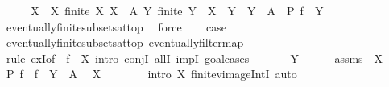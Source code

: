 \begin{isabellebody}
\ \ \isamarkupfalse%
\ \isamarkupfalse%
\ X\ \ X{\isacharcolon}{\kern0pt}\ {\isachardoublequoteopen}finite\ X{\isachardoublequoteclose}\ {\isachardoublequoteopen}X\ {\isasymsubseteq}\ A{\isachardoublequoteclose}\ {\isachardoublequoteopen}{\isasymAnd}Y{\isachardot}{\kern0pt}\ finite\ Y\ {\isasymLongrightarrow}\ X\ {\isasymsubseteq}\ Y\ {\isasymLongrightarrow}\ Y\ {\isasymsubseteq}\ A\ {\isasymLongrightarrow}\ P\ {\isacharparenleft}{\kern0pt}f\ {\isacharbackquote}{\kern0pt}\ Y{\isacharparenright}{\kern0pt}{\isachardoublequoteclose}\isanewline
\ \ \ \ \isamarkupfalse%
\ eventually{\isacharunderscore}{\kern0pt}finite{\isacharunderscore}{\kern0pt}subsets{\isacharunderscore}{\kern0pt}at{\isacharunderscore}{\kern0pt}top\ \isamarkupfalse%
\ force\isanewline
\ \ \isamarkupfalse%
\ {\isacharquery}{\kern0pt}case\ \isamarkupfalse%
\ eventually{\isacharunderscore}{\kern0pt}finite{\isacharunderscore}{\kern0pt}subsets{\isacharunderscore}{\kern0pt}at{\isacharunderscore}{\kern0pt}top\ eventually{\isacharunderscore}{\kern0pt}filtermap\isanewline
\ \ \isamarkupfalse%
\ {\isacharparenleft}{\kern0pt}rule\ exI{\isacharbrackleft}{\kern0pt}of\ {\isacharunderscore}{\kern0pt}\ {\isachardoublequoteopen}f\ {\isacharbackquote}{\kern0pt}\ X{\isachardoublequoteclose}{\isacharbrackright}{\kern0pt}{\isacharcomma}{\kern0pt}\ intro\ conjI\ allI\ impI{\isacharcomma}{\kern0pt}\ goal{\isacharunderscore}{\kern0pt}cases{\isacharparenright}{\kern0pt}\isanewline
\ \ \ \ \isamarkupfalse%
\ {\isacharparenleft}{\kern0pt}{}\ Y{\isacharparenright}{\kern0pt}\isanewline
\ \ \ \ \isamarkupfalse%
\ assms\ \ X{\isacharparenleft}{\kern0pt}{}{\isacharcomma}{\kern0pt}{}{\isacharparenright}{\kern0pt}\ \isamarkupfalse%
\ {\isachardoublequoteopen}P\ {\isacharparenleft}{\kern0pt}f\ {\isacharbackquote}{\kern0pt}\ {\isacharparenleft}{\kern0pt}f\ {\isacharminus}{\kern0pt}{\isacharbackquote}{\kern0pt}\ Y\ {\isasyminter}\ A{\isacharparenright}{\kern0pt}{\isacharparenright}{\kern0pt}{\isachardoublequoteclose}\ \isamarkupfalse%
\ X{\isacharparenleft}{\kern0pt}{}{\isacharcomma}{\kern0pt}{}{\isacharparenright}{\kern0pt}\isanewline
\ \ \ \ \ \ \isamarkupfalse%
\ {\isacharparenleft}{\kern0pt}intro\ X{\isacharparenleft}{\kern0pt}{}{\isacharparenright}{\kern0pt}\ finite{\isacharunderscore}{\kern0pt}vimage{\isacharunderscore}{\kern0pt}IntI{\isacharparenright}{\kern0pt}\ auto\isanewline

\end{isabellebody}
